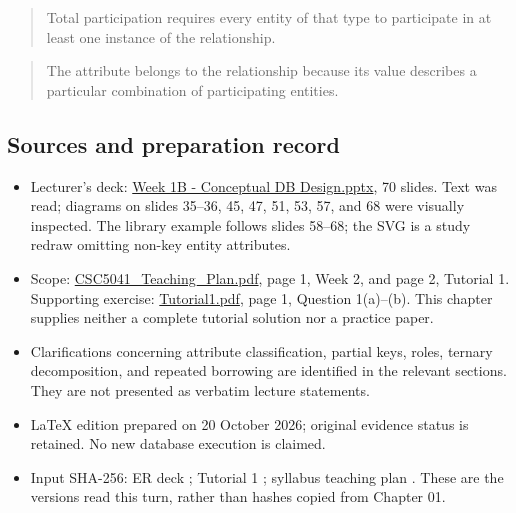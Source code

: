 \begin{quote}
Total participation requires every entity of that type to participate in at least one instance of the relationship.
\end{quote}

\begin{quote}
The attribute belongs to the relationship because its value describes a particular combination of participating entities.
\end{quote}

\subsection{Sources and preparation record}\label{02_er_modelling_en-sources-and-preparation-record}

\begin{itemize}
\tightlist
\item
  Lecturer's deck: \href{../../../slides/Week\%201B\%20-\%20Conceptual\%20DB\%20Design.pptx}{Week 1B - Conceptual DB Design.pptx}, 70 slides. Text was read; diagrams on slides 35--36, 45, 47, 51, 53, 57, and 68 were visually inspected. The library example follows slides 58--68; the SVG is a study redraw omitting non-key entity attributes.
\item
  Scope: \href{../../../syllabus/CSC5041_Teaching_Plan.pdf}{CSC5041\_Teaching\_Plan.pdf}, page 1, Week 2, and page 2, Tutorial 1. Supporting exercise: \href{../../../slides/Tutorial1.pdf}{Tutorial1.pdf}, page 1, Question 1(a)--(b). This chapter supplies neither a complete tutorial solution nor a practice paper.
\item
  Clarifications concerning attribute classification, partial keys, roles, ternary decomposition, and repeated borrowing are identified in the relevant sections. They are not presented as verbatim lecture statements.
\item
  LaTeX edition prepared on 20 October 2026; original evidence status is retained. No new database execution is claimed.
\item
  Input SHA-256: ER deck \texttt{}; Tutorial 1 \texttt{}; syllabus teaching plan \texttt{}. These are the versions read this turn, rather than hashes copied from Chapter 01.
\end{itemize}
